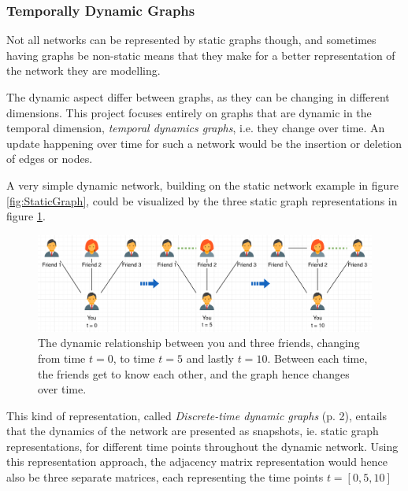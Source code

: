 \subsubsection{Temporally Dynamic Graphs}
\label{sec:Method:Graphs:DynamicGraphs}
Not all networks can be represented by static graphs though, and sometimes having graphs be non-static means that they make for a better representation of the network they are modelling. 

The dynamic aspect differ between graphs, as they can be changing in different dimensions. 
This project focuses entirely on graphs that are dynamic in the temporal dimension, \textit{temporal dynamics graphs}, i.e. they change over time. 
An update happening over time for such a network would be the insertion or deletion of edges or nodes.

A very simple dynamic network, building on the static network example in figure \ref{fig:StaticGraph}, could be visualized by the three static graph representations in figure \ref{fig:DynamicGraph}.

\begin{figure}[H]
    \centering
    \includegraphics[width=\textwidth]{0_images/dynamic_graph2.png}
    \caption{The dynamic relationship between you and three friends, changing from time $t=0$, to time $t=5$ and lastly $t=10$. Between each time, the friends get to know each other, and the graph hence changes over time.}
    \label{fig:DynamicGraph}
\end{figure}
This kind of representation, called \textit{Discrete-time dynamic graphs} \cite{Rossi2020TEMPORALGRAPHS} (p. 2), entails that the dynamics of the network are presented as snapshots, ie. static graph representations, for different time points throughout the dynamic network.
Using this representation approach, the adjacency matrix representation would hence also be three separate matrices, each representing the time points $t= [0,5,10]$ 

